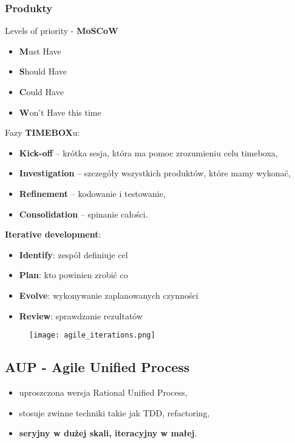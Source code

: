 \documentclass[../main.tex]{subfiles}
\begin{document}
    \subsubsection{Produkty}

    Levels of priority - \textbf{MoSCoW}
    \begin{itemize}
        \item \textbf{M}ust Have
        \item \textbf{S}hould Have
        \item \textbf{C}ould Have
        \item \textbf{W}on’t Have this time
    \end{itemize}

    Fazy \textbf{TIMEBOX}u:
    \begin{itemize}
        \item \textbf{Kick-off} – krótka sesja, która ma pomoc zrozumieniu celu timeboxa,
        \item \textbf{Investigation} – szczegóły wszystkich produktów, które mamy wykonać,
        \item \textbf{Refinement} – kodowanie i testowanie,
        \item \textbf{Consolidation} – spinanie całości.
    \end{itemize}

    \textbf{Iterative development}:
    \begin{itemize}
        \item \textbf{Identify}: zespół definiuje cel
        \item \textbf{Plan}: kto powinien zrobić co
        \item \textbf{Evolve}: wykonywanie
        zaplanowanych czynności
        \item \textbf{Review}: sprawdzanie rezultatów
    \end{itemize}


    \begin{figure}[H]
        \texttt{[image: agile\_iterations.png]}
    \end{figure}


    \subsection{AUP - Agile Unified Process}

    \begin{itemize}
        \item uproszczona wersja Rational Unified Process,
        \item stosuje zwinne techniki takie jak TDD, refactoring,
        \item \textbf{seryjny w dużej skali, iteracyjny w małej}.
    \end{itemize}
\end{document}
